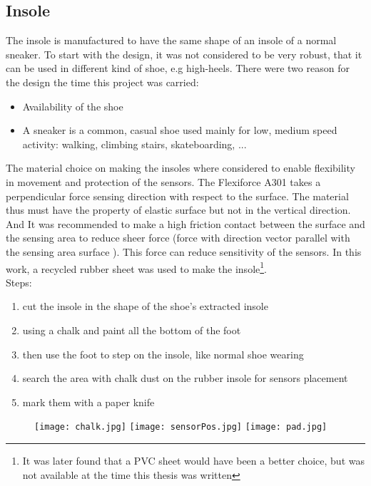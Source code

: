 \documentclass[12 pt, a4paper]{thesis}
\begin{document}
\subsection{Insole}
The insole is manufactured to have the same shape of an insole of a normal sneaker. To start with the design, it was not considered to be very robust, that it can be used in different kind of shoe, e.g high-heels. There were two reason for the design the time this project was carried:
\begin{itemize}
\item{Availability of the shoe}
\item{A sneaker is a common, casual shoe used mainly for low, medium speed activity: walking, climbing stairs, skateboarding, ...}
\end{itemize}
The material choice on making the insoles where considered to enable flexibility in movement and protection of the sensors. The Flexiforce A301 takes a perpendicular force sensing direction with respect to the surface. The material thus must have the property of elastic surface but not in the vertical direction. And It was recommended to make a high friction contact between the surface and the sensing area to reduce sheer force (force with direction vector parallel with the sensing area surface ). This force can reduce sensitivity of the sensors. In this work, a recycled rubber sheet was used to make the insole\footnote{It was later found that a PVC sheet would have been a better choice, but was not available at the time this thesis was written}.\\
Steps:
\begin{enumerate}
\item{cut the insole in the shape of the shoe's extracted insole}
\item{using a chalk and paint all the bottom of the foot}
\item{then use the foot to step on the insole, like normal shoe wearing}
\item{search the area with chalk dust on the rubber insole for sensors placement}
\item{mark them with a paper knife}
\end{enumerate}
\begin{figure}[hbt!]
\begin{center}
\texttt{[image: chalk.jpg]}
\hfill
\texttt{[image: sensorPos.jpg]}
\hfill
\texttt{[image: pad.jpg]}
\end{center}
\end{figure}
\end{document}
